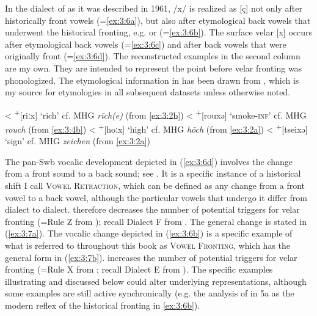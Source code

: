 In the dialect of  as it was described in 1961, /x/ is realized as [ç] not only after historically front vowels (=\ref{ex:3:6a}), but also after etymological back vowels that underwent the historical fronting, e.g.  or  (=\ref{ex:3:6b}). The surface velar [x] occurs after etymological back vowels (=\ref{ex:3:6c}) and after back vowels that were originally front (=\ref{ex:3:6d}). The reconstructed examples in the second column are my own. They are intended to represent the point before velar fronting was phonologized. The etymological information in  has been drawn from \citet{Seebold2011}, which is my source for etymologies in all subsequent datasets unless otherwise noted.

\ea\label{ex:3:6}%
\TabPositions{1.5cm, 1.8cm, 2cm, 3.5cm, 5.5cm, 8.25cm}
\ea\label{ex:3:6a}\relax  [reiç]   \tab <  \tab \textsuperscript{+}[riːx]   \tab ‘rich’               \tab cf. MHG \textit{rīch(e)} \tab (from \ref{ex:3:2b})
\ex\label{ex:3:6b}\relax  [reiçə]  \tab <  \tab \textsuperscript{+}[rouxə]  \tab ‘smoke-\textsc{inf}’ \tab cf. MHG \textit{rouch}   \tab (from \ref{ex:3:4b})
\ex\label{ex:3:6c}\relax  [hoːx]   \tab <  \tab \textsuperscript{+}[hoːx]   \tab ‘high’               \tab cf. MHG \textit{hōch}    \tab (from \ref{ex:3:2a})
\ex\label{ex:3:6d}\relax  [tsɔəxə] \tab <  \tab \textsuperscript{+}[tseixə] \tab ‘sign’               \tab cf. MHG \textit{zeichen} \tab (from \ref{ex:3:2a})
\z 
\z 

The pan-Swb vocalic development depicted in (\ref{ex:3:6d}) involves the change from a front sound to a back sound; see \citet[42--43]{Besch1961}. It is a specific instance of a historical shift I call \textsc{Vowel} \textsc{Retraction}, which can be defined as any change from a front vowel to a back vowel, although the particular vowels that undergo it differ from dialect to dialect.  therefore decreases the number of potential triggers for velar fronting (=Rule Z from ); recall Dialect F from . The general change is stated in (\ref{ex:3:7a}). The vocalic change depicted in (\ref{ex:3:6b}) is a specific example of what is referred to throughout this book as \textsc{Vowel} \textsc{Fronting}, which has the general form in (\ref{ex:3:7b}).  increases the number of potential triggers for velar fronting (=Rule X from ; recall Dialect E from ). The specific examples illustrating  and  discussed below could alter underlying representations, although some examples are still active synchronically (e.g. the analysis of  in 5a as the modern reflex of the historical fronting in \ref{ex:3:6b}).

